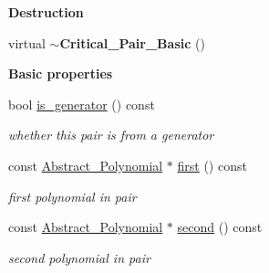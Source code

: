 \begin{Indent}\textbf{ Destruction}\par
\begin{DoxyCompactItemize}
\item 
\mbox{\label{group___g_b_computation_a5a3c9fa67ec45e8f9891d667c1ff43ec}} 
virtual {\bfseries $\sim$\+Critical\+\_\+\+Pair\+\_\+\+Basic} ()
\end{DoxyCompactItemize}
\end{Indent}
\begin{Indent}\textbf{ Basic properties}\par
\begin{DoxyCompactItemize}
\item 
\mbox{\label{group___g_b_computation_a621825e77a7f79234307be09d2fcf036}} 
bool \hyperlink{group___g_b_computation_a621825e77a7f79234307be09d2fcf036}{is\+\_\+generator} () const
\begin{DoxyCompactList}\small\item\em whether this pair is from a generator \end{DoxyCompactList}\item 
\mbox{\label{group___g_b_computation_a6e251e3724fde2c610d921f93889eb67}} 
const \hyperlink{group__polygroup_class_abstract___polynomial}{Abstract\+\_\+\+Polynomial} $\ast$ \hyperlink{group___g_b_computation_a6e251e3724fde2c610d921f93889eb67}{first} () const
\begin{DoxyCompactList}\small\item\em first polynomial in pair \end{DoxyCompactList}\item 
\mbox{\label{group___g_b_computation_a06da1cbbe1451962b68f2bbf90855fae}} 
const \hyperlink{group__polygroup_class_abstract___polynomial}{Abstract\+\_\+\+Polynomial} $\ast$ \hyperlink{group___g_b_computation_a06da1cbbe1451962b68f2bbf90855fae}{second} () const
\begin{DoxyCompactList}\small\item\em second polynomial in pair \end{DoxyCompactList}\item 
\mbox{\label{group___g_b_computation_a336387d4ddd4f184399212599dbcb130}} 

\end{DoxyCompactItemize}
\end{Indent}
